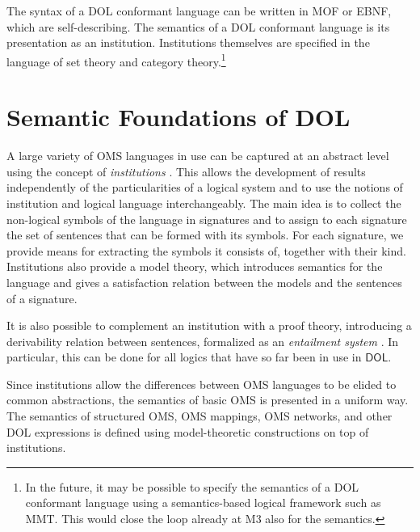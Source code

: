 \documentclass[10pt,fleqn,%
\ifpretendfinal
final%
\else
draft%
\fi,
]{scrreprt}
\newcommand*{\DOL}{\ensuremath{\mathsf{DOL}}\xspace}
\begin{document}
The syntax of a DOL conformant language can be written in MOF or EBNF,
which are self-describing.  The semantics of a DOL conformant language
is its presentation as an institution. Institutions themselves are
specified in the language of set theory and category
theory.\footnote{In the future, it may be possible to specify the
  semantics of a DOL conformant language using a semantics-based
  logical framework such as MMT. This would close the loop already at
  M3 also for the semantics.}

\section{Semantic Foundations of DOL}\label{sem-foundations}


A large variety of OMS languages in use can be captured at an abstract level using the concept of 
\emph{institutions} \cite{GoguenBurstall92}.
This allows the development of results independently of the particularities of a logical system and to use the notions of institution and  logical language interchangeably. 
The main idea is to collect the non-logical
symbols of the language in signatures and to assign to each signature the set of sentences that can be formed with its symbols. 
For each signature, we provide means for extracting the symbols it consists of, together with their kind.
Institutions also provide a model theory, which introduces semantics for
the language and gives a satisfaction relation between the models and
the sentences of a signature.   

It is also possible to complement an institution with a proof theory,
introducing a derivability relation between sentences, formalized as 
an \emph{entailment system} \cite{Meseguer89}. In particular, this
can be done for all logics that have so far been in use in \DOL.


Since institutions allow the differences between OMS languages to be elided to common abstractions, 
the semantics of basic OMS is presented in a uniform way.  The semantics of structured OMS, 
OMS mappings, OMS networks, and other DOL expressions is defined using model-theoretic constructions
on top of institutions. 
\end{document}
